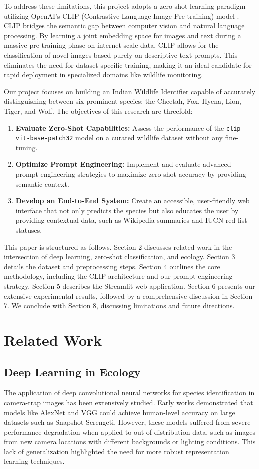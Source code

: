 \documentclass[11pt]{article}
\begin{document}
To address these limitations, this project adopts a zero-shot learning paradigm utilizing OpenAI's CLIP (Contrastive Language-Image Pre-training) model \citep{radford2021learning}. CLIP bridges the semantic gap between computer vision and natural language processing. By learning a joint embedding space for images and text during a massive pre-training phase on internet-scale data, CLIP allows for the classification of novel images based purely on descriptive text prompts. This eliminates the need for dataset-specific training, making it an ideal candidate for rapid deployment in specialized domains like wildlife monitoring.

Our project focuses on building an Indian Wildlife Identifier capable of accurately distinguishing between six prominent species: the Cheetah, Fox, Hyena, Lion, Tiger, and Wolf. The objectives of this research are threefold:
\begin{enumerate}
    \item \textbf{Evaluate Zero-Shot Capabilities:} Assess the performance of the \texttt{clip-vit-base-patch32} model on a curated wildlife dataset without any fine-tuning.
    \item \textbf{Optimize Prompt Engineering:} Implement and evaluate advanced prompt engineering strategies to maximize zero-shot accuracy by providing semantic context.
    \item \textbf{Develop an End-to-End System:} Create an accessible, user-friendly web interface that not only predicts the species but also educates the user by providing contextual data, such as Wikipedia summaries and IUCN red list statuses.
\end{enumerate}

This paper is structured as follows. Section 2 discusses related work in the intersection of deep learning, zero-shot classification, and ecology. Section 3 details the dataset and preprocessing steps. Section 4 outlines the core methodology, including the CLIP architecture and our prompt engineering strategy. Section 5 describes the Streamlit web application. Section 6 presents our extensive experimental results, followed by a comprehensive discussion in Section 7. We conclude with Section 8, discussing limitations and future directions.

\section{Related Work}

\subsection{Deep Learning in Ecology}
The application of deep convolutional neural networks for species identification in camera-trap images has been extensively studied. Early works demonstrated that models like AlexNet and VGG could achieve human-level accuracy on large datasets such as Snapshot Serengeti. However, these models suffered from severe performance degradation when applied to out-of-distribution data, such as images from new camera locations with different backgrounds or lighting conditions. This lack of generalization highlighted the need for more robust representation learning techniques.
\end{document}
